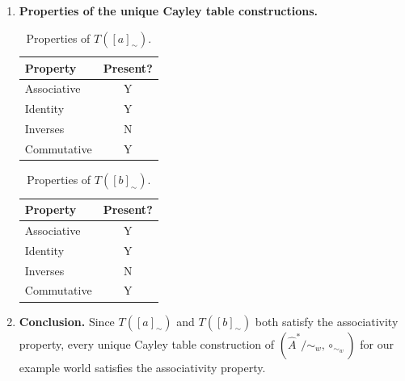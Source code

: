 \begin{proofE}
\begin{enumerate}[(1)]
    \item \textbf{Properties of the unique Cayley table constructions.}
    \begin{table}[H]
        \centering
        \begin{tabular}{l|c}
        \textbf{Property} & \textbf{Present?} \\
        \hline
        Associative & Y \\
        Identity & Y \\
        Inverses & N \\
        \hline
        Commutative & Y \\
        \end{tabular}
        \caption{
        Properties of $T([a]_{\sim})$.
        }
    \end{table}
    
    \begin{table}[H]
        \centering
        \begin{tabular}{l|c}
        \textbf{Property} & \textbf{Present?} \\
        \hline
        Associative & Y \\
        Identity & Y \\
        Inverses & N \\
        \hline
        Commutative & Y \\
        \end{tabular}
        \caption{
        Properties of $T([b]_{\sim})$.
        }
    \end{table}

    \item \textbf{Conclusion.}
    Since $T([a]_{\sim})$ and $T([b]_{\sim})$ both satisfy the associativity property, every unique Cayley table construction of $(\hat{A}^{*}/\sim_{w}, \circ_{\sim_{w}})$ for our example world satisfies the associativity property.
\end{enumerate}
\end{proofE}



